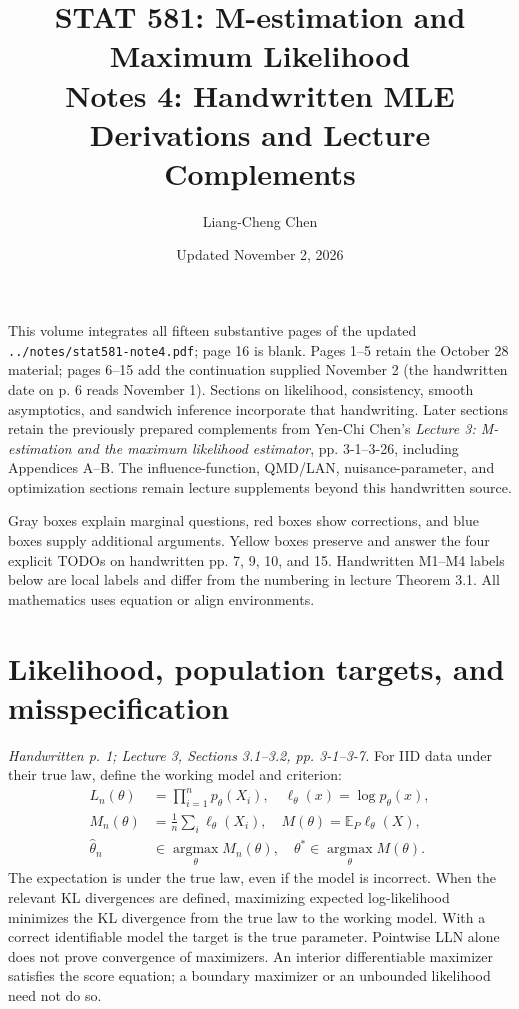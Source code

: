 \documentclass[12pt]{article}
\title{STAT 581: M-estimation and Maximum Likelihood\\\large Notes 4: Handwritten MLE Derivations and Lecture Complements}
\author{Liang-Cheng Chen}
\date{Updated November 2, 2026}
\newcommand{\E}{\mathbb E}
\begin{document}
\maketitle
\begin{remarkbox}
\raggedright
This volume integrates all fifteen substantive pages of the updated
\texttt{../notes/stat581-note4.pdf}; page 16 is blank. Pages 1--5
retain the October 28 material; pages 6--15 add the continuation supplied November 2
(the handwritten date on p. 6 reads November 1).
Sections on likelihood, consistency, smooth asymptotics, and sandwich
inference incorporate that handwriting. Later sections retain the
previously prepared complements from Yen-Chi Chen's \emph{Lecture 3:
M-estimation and the maximum likelihood estimator}, pp. 3-1--3-26,
including Appendices A--B. The influence-function, QMD/LAN, nuisance-parameter, and optimization
sections remain lecture supplements beyond this handwritten source.

Gray boxes explain marginal questions, red boxes show corrections, and
blue boxes supply additional arguments. Yellow boxes preserve and answer
the four explicit TODOs on handwritten pp. 7, 9, 10, and 15. Handwritten
M1--M4 labels below are local labels and differ from the numbering in lecture Theorem 3.1.
All mathematics uses equation or align environments.
\end{remarkbox}
\clearpage
\tableofcontents
\clearpage
\section{Likelihood, population targets, and misspecification}
\textit{Handwritten p. 1; Lecture 3, Sections 3.1--3.2, pp. 3-1--3-7.}
For IID data under their true law, define the working model and criterion:
\begin{align}
 L_n(\theta)&=\prod_{i=1}^np_\theta(X_i),\quad
 \ell_\theta(x)=\log p_\theta(x),\\
 M_n(\theta)&=\frac1n\sum_i\ell_\theta(X_i),\quad
 M(\theta)=\E_P\ell_\theta(X),\\
 \widehat\theta_n&\in\operatorname*{argmax}_\theta M_n(\theta),\quad
 \theta^*\in\operatorname*{argmax}_\theta M(\theta).
\end{align}
The expectation is under the true law, even if the model is incorrect.
When the relevant KL divergences are defined, maximizing expected
log-likelihood minimizes the KL divergence from the true law to the
working model. With a correct identifiable model the target is the true
parameter. Pointwise LLN alone does not prove convergence of maximizers.
An interior differentiable maximizer satisfies the score equation; a
boundary maximizer or an unbounded likelihood need not do so.
\end{document}
